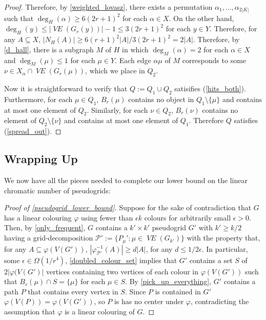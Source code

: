 \documentclass{patmorin}
\DeclareMathOperator{\VE}{\mathit{VE}}
\begin{document}
\begin{proof}
  Therefore, by \cref{weighted_lovasz}, there exists a permutation $\alpha_1,\ldots,\alpha_{2|K|}$ such that $\deg_H(\alpha)\ge 6(2r+1)^2$ for each $\alpha\in X$.  On the other hand, $\deg_{H}(y)\le |\VE(G_r(y))|-1 \le 3(2r+1)^2$ for each $y\in Y$.  Therefore, for any $A\subseteq X$, $|N_H(A)|\ge 6(r+1)^2|A|/3(2r+1)^2 = 2|A|$.  Therefore, by \cref{d_hall}, there is a subgraph $M$ of $H$ in which $\deg_M(\alpha)=2$ for each $\alpha\in X$ and $\deg_M(\mu)\le 1$ for each $\mu\in Y$. Each edge $\alpha\mu$ of $M$ corresponds to some $\nu\in X_\alpha\cap\VE(G_r(\mu))$, which we place in $Q_2$.

  Now it is straightforward to verify that $Q:=Q_1\cup Q_2$ satisifies (\ref{hits_both}).  Furthermore, for each $\mu\in Q_1$, $B_r(\mu)$ contains no object in $Q_1\setminus\{\mu\}$ and contains at most one element of $Q_2$.  Similarly, for each $\nu\in Q_2$, $B_r(\nu)$ contains no element of $Q_2\setminus\{\nu\}$ and contains at most one element of $Q_1$.  Therefore $Q$ satisfies (\ref{spread_out}).
\end{proof}

\subsection{Wrapping Up}
\label{wrapping_up}

We now have all the pieces needed to complete our lower bound on the linear chromatic number of pseudogrids:

\begin{proof}[Proof of \cref{pseudogrid_lower_bound}]
  Suppose for the sake of contradiction that $G$ has a linear colouring $\varphi$ using fewer than $\epsilon k$ colours for arbitrarily small $\epsilon >0$.  Then, by \cref{only_frequent}, $G$ contains a $k'\times k'$ pseudogrid $G'$ with $k'\ge k/2$ having a grid-decomposition $\mathcal{P}':=\{P_\mu':\mu\in \VE(G_{k'})\}$ with the property that, for any $A\subseteq\varphi(V(G'))$, $|\varphi^{-1}_{\mathcal{P'}}(A)|\ge d|A|$, for any $d\le 1/2\epsilon$.  In particular, some $\epsilon \in \Omega(1/r^4)$, \cref{doubled_colour_set} implies that $G'$ contains a set $S$ of $2|\varphi(V(G')|$ vertices containing two vertices of each colour in $\varphi(V(G'))$ such that $B_r(\mu)\cap S = \{\mu\}$ for each $\mu\in S$.  By \cref{pick_up_everything}, $G'$ contains a path $P$ that contains every vertex in $S$.  Since $P$ is contained in $G'$ $\varphi(V(P))=\varphi(V(G'))$, so $P$ is has no center under $\varphi$, contradicting the assumption that $\varphi$ is a linear colouring of $G$.
\end{proof}
\end{document}
